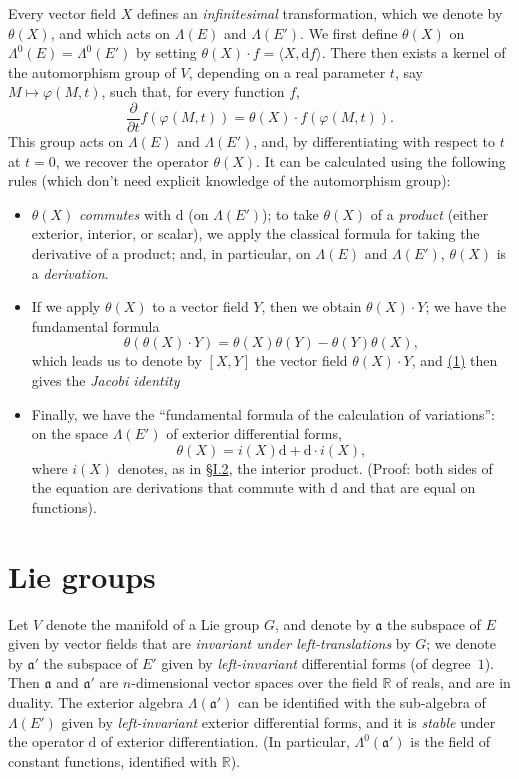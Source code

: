 \documentclass{article}
\newcommand{\dd}{\mathrm{d}}
\newcommand{\RR}{\mathbb{R}}
\newcommand{\fk}{\mathfrak}
\newcommand{\oldpage}[1]{\marginpar{\footnotesize$\Big\vert$ \textit{p.~#1}}}
\begin{document}
Every vector field $X$ defines an \emph{infinitesimal} transformation, which we denote by $\theta(X)$, and which acts on $\Lambda(E)$ and $\Lambda(E')$.
We first define $\theta(X)$ on $\Lambda^0(E)=\Lambda^0(E')$ by setting $\theta(X)\cdot f=\langle X,\dd f\rangle$.
There then exists a kernel of the automorphism group of $V$, depending on a real parameter $t$, say $M\mapsto\varphi(M,t)$, such that, for every function $f$,
\[
  \frac{\partial}{\partial t} f(\varphi(M,t))
  = \theta(X)\cdot f(\varphi(M,t)).
\]
This group acts on $\Lambda(E)$ and $\Lambda(E')$, and, by differentiating with respect to $t$ at $t=0$, we recover the operator $\theta(X)$.
It can be calculated using the following rules (which don't need explicit knowledge of the automorphism group):
\begin{itemize}
  \item $\theta(X)$ \emph{commutes} with $\dd$ (on $\Lambda(E')$); to take $\theta(X)$ of a \emph{product} (either exterior, interior, or scalar), we apply the classical formula for taking the derivative of a product; and, in particular, on $\Lambda(E)$ and $\Lambda(E')$, $\theta(X)$ is a \emph{derivation}.
  \item If we apply $\theta(X)$ to a vector field $Y$, then we obtain $\theta(X)\cdot Y$; we have the fundamental formula
    \[
    \label{equation-I.1}
      \theta(\theta(X)\cdot Y) = \theta(X)\theta(Y) - \theta(Y)\theta(X),
    \tag{1}
    \]
    which leads us to denote by $[X,Y]$ the vector field $\theta(X)\cdot Y$, and \hyperref[equation-I.1]{(1)} then gives the \emph{Jacobi identity}
\oldpage{10}
  \item Finally, we have the ``fundamental formula of the calculation of variations'':
    on the space $\Lambda(E')$ of exterior differential forms,
    \[
    \label{equation-I.2}
      \theta(X) = i(X)\dd + \dd\cdot i(X),
    \tag{2}
    \]
    where $i(X)$ denotes, as in \hyperref[I.2]{\S I.2}, the interior product.
    (Proof: both sides of the equation are derivations that commute with $\dd$ and that are equal on functions).
\end{itemize}


\section{Lie groups}
\label{I.5}

Let $V$ denote the manifold of a Lie group $G$, and denote by $\fk{a}$ the subspace of $E$ given by vector fields that are \emph{invariant under left-translations} by $G$;
we denote by $\fk{a}'$ the subspace of $E'$ given by \emph{left-invariant} differential forms (of degree~$1$).
Then $\fk{a}$ and $\fk{a}'$ are $n$-dimensional vector spaces over the field $\RR$ of reals, and are in duality.
The exterior algebra $\Lambda(\fk{a}')$ can be identified with the sub-algebra of $\Lambda(E')$ given by \emph{left-invariant} exterior differential forms, and it is \emph{stable} under the operator $\dd$ of exterior differentiation.
(In particular, $\Lambda^0(\fk{a}')$ is the field of constant functions, identified with $\RR$).
\end{document}
